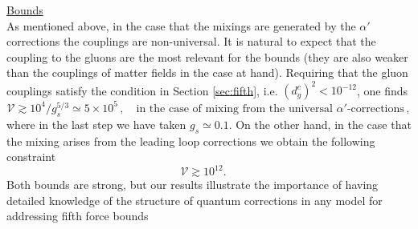 \documentclass[11pt,a4paper]{article}
\newcommand{\V}{\mathcal{V}}
\begin{document}
\vspace{0.2 cm}

\noindent \underline{Bounds}\\
As mentioned above, in the case that the mixings are generated by the $\alpha'$ corrections the couplings are non-universal. It is natural to expect that the coupling to the gluons are the most relevant for the bounds \cite{Adelberger:2003zx} (they are also weaker than the couplings of matter fields in the case at hand).  Requiring that the gluon couplings satisfy the condition in Section \ref{sec:fifth}, i.e. $(d^c_{g})^2  < 10^{-12}$, one finds
%
\begin{equation}
  \V \gtrsim 10^4/g_s^{5/3} \simeq 5 \times 10^5\,, \quad \text{in the case of mixing from the universal $\alpha'$-corrections} \,,
\end{equation}
where in the last step we have taken $g_s \simeq 0.1$. On the other hand, in the case that the mixing arises from the leading loop corrections we obtain the following constraint
%
\begin{equation}
  \V \gtrsim 10^{12}.  \quad  
\end{equation}
%
Both bounds are strong, but our results illustrate the importance of having detailed knowledge of the structure of quantum corrections in any model for addressing fifth force bounds
 
\end{document}
